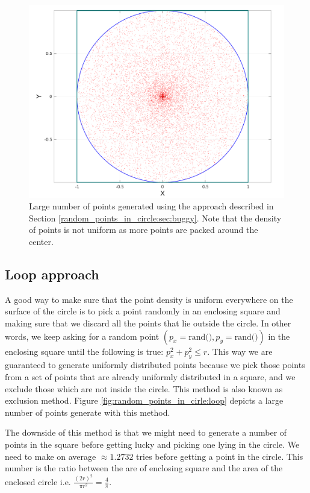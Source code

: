 \begin{figure}
	\label{fig:random_points_in_cirle:buggy}
	\centering
	\includegraphics[scale=0.3]{sources/random_points_in_circle/images/buggy_points}
	\caption{Large number of points generated using the approach described in Section \ref{random_points_in_circle:sec:buggy}. Note that the density of points is not uniform as more points are packed around the center.}
\end{figure}

\subsection{Loop approach}
\label{random_points_in_circle:sec:loop}
A good way to make sure that the point density is uniform everywhere on the surface of the circle is to pick a point randomly in an enclosing square and making sure that we discard all the points that lie outside the circle. In other words, we keep asking for a random point $(p_x=\text{rand()}, p_y=\text{rand()})$ in the enclosing square until the following is true: $p_x^2 + p_y^2 \leq r$. This way we are guaranteed to generate uniformly distributed points because we pick those points from a set of points that are already uniformly distributed in a square, and we exclude those which are not inside the circle. This method is also known as exclusion method. Figure \ref{fig:random_points_in_cirle:loop} depicts a large number of points generate with this method.

The downside of this method is that we might need to generate a number of points in the square before getting lucky and picking one lying in the circle. We need to make on average $\approx 1.2732$ tries before getting a point in the circle. This number is  the ratio between the are of enclosing square and the area of the enclosed circle i.e. $\frac{(2r)^2}{\pi r^2} = \frac{4}{\pi}$. 

